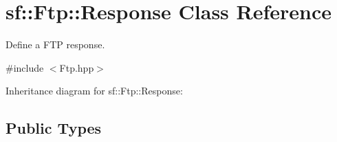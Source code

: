 \hypertarget{classsf_1_1_ftp_1_1_response}{}\section{sf\+:\+:Ftp\+:\+:Response Class Reference}
\label{classsf_1_1_ftp_1_1_response}


Define a F\+TP response.  




{\ttfamily \#include $<$Ftp.\+hpp$>$}



Inheritance diagram for sf\+:\+:Ftp\+:\+:Response\+:
\subsection*{Public Types}

